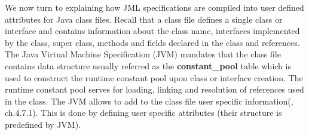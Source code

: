 We now turn to explaining how JML specifications are compiled into user defined attributes for Java class files. Recall that a class file defines
a single class or interface and contains information about  the class name, interfaces implemented by the class, super class, methods and fields declared in the class and references. The Java Virtual Machine Specification (JVM) \cite{VMSpec} mandates that the class file contains data structure usually referred as the \textbf{constant\_pool} table which is used to construct the runtime constant pool upon class or interface creation. The runtime constant pool serves for loading, linking and resolution of references used in the class. The JVM allows to add to the class file user specific information(\cite{VMSpec}, ch.4.7.1). This is done by defining user specific attributes  (their structure is predefined by JVM).

